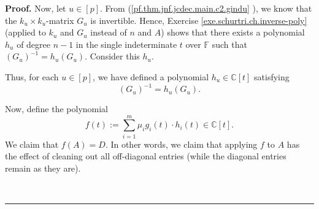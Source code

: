 \documentclass[numbers=enddot,12pt,final,onecolumn,notitlepage]{scrartcl}%
\numberwithin{exer}{subsection}
\theoremstyle{definition}
\newenvironment{proof}[1][Proof]{\noindent\textbf{#1.} }{\ \rule{0.5em}{0.5em}}
\let\sumnonlimits\sum
\renewcommand{\sum}{\sumnonlimits\limits}
\newenvironment{noncompile}{}{}
\begin{document}
\begin{proof}
\begin{noncompile}
Now, let $u\in\left[  p\right]  $. From (\ref{pf.thm.jnf.jcdec.main.c2.gindu}%
), we know that the $k_{u}\times k_{u}$-matrix $G_{u}$ is invertible. Hence,
Exercise \ref{exe.schurtri.ch.inverse-poly} (applied to $k_{u}$ and $G_{u}$
instead of $n$ and $A$) shows that there exists a polynomial $h_{u}$ of degree
$n-1$ in the single indeterminate $t$ over $\mathbb{F}$ such that $\left(
G_{u}\right)  ^{-1}=h_{u}\left(  G_{u}\right)  $. Consider this $h_{u}$.

Thus, for each $u\in\left[  p\right]  $, we have defined a polynomial
$h_{u}\in\mathbb{C}\left[  t\right]  $ satisfying%
\begin{equation}
\left(  G_{u}\right)  ^{-1}=h_{u}\left(  G_{u}\right)  .
\label{pf.thm.jnf.jcdec.main.c2.hu}%
\end{equation}


Now, define the polynomial%
\begin{equation}
f\left(  t\right)  :=\sum_{i=1}^{m}\mu_{i}g_{i}\left(  t\right)  \cdot
h_{i}\left(  t\right)  \in\mathbb{C}\left[  t\right]  .
\label{pf.thm.jnf.jcdec.main.c2.f-def}%
\end{equation}
We claim that $f\left(  A\right)  =D$. In other words, we claim that applying
$f$ to $A$ has the effect of cleaning out all off-diagonal entries (while the
diagonal entries remain as they are).


\end{noncompile}
\end{proof}
\end{document}
